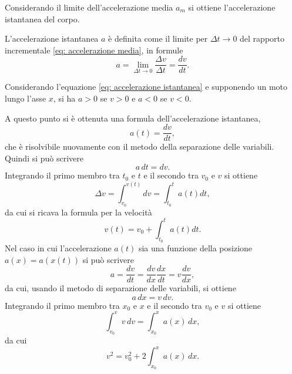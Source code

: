 Considerando il limite dell'accelerazione media $a_m$ si ottiene l'accelerazione istantanea del corpo.
\begin{defn}
    L'accelerazione istantanea $a$ è definita come il limite per $\Delta t\to0$ del rapporto incrementale \eqref{eq: accelerazione media}, in formule
    \begin{equation}
    \label{eq: accelerazione istantanea}
        a=\lim_{\Delta t\to0}{\frac{\Delta v}{\Delta t}}=\frac{dv}{dt}.
    \end{equation}
\end{defn}
\begin{obs}
    Considerando l'equazione \eqref{eq: accelerazione istantanea} e supponendo un moto lungo l'asse $x$, si ha $a>0$ se $v>0$ e $a<0$ se $v<0$.
\end{obs}
A questo punto si è ottenuta una formula dell'accelerazione istantanea,
\begin{equation}
    a(t)=\frac{dv}{dt},
\end{equation}
che è risolvibile nuovamente con il metodo della separazione delle variabili. Quindi si può scrivere
\begin{equation}
    a\,dt=dv.
\end{equation}
Integrando il primo membro tra $t_0$ e $t$ e il secondo tra $v_0$ e $v$ si ottiene
\begin{equation}
    \Delta v=\int_{v_0}^{v(t)}{dv}=\int_{t_0}^{t}{a(t)dt},
\end{equation}
da cui si ricava la formula per la velocità
\begin{equation}
\label{eq: velocità moto rellineo}
    v(t)=v_0+\int_{t_0}^{t}{a(t)dt}.
\end{equation}
Nel caso in cui l'accelerazione $a(t)$ sia una funzione della posizione $a(x)=a(x(t))$ si può scrivere
\begin{equation}
    a=\frac{dv}{dt}=\frac{dv}{dx}\frac{dx}{dt}=v\frac{dv}{dx},
\end{equation}
da cui, usando il metodo di separazione delle variabili, si ottiene
\begin{equation}
    a\,dx=v\,dv.
\end{equation}
Integrando il primo membro tra $x_0$ e $x$ e il secondo tra $v_0$ e $v$ si ottiene
\begin{equation}
    \int_{v_0}^{v}v\,dv=\int_{x_0}^{x}a(x)\,dx,
\end{equation}
da cui
\begin{equation}
\label{eq: v^2 moto rettilineo}
    v^2=v_0^2+2\int_{x_0}^{x}a(x)\,dx.
\end{equation}

